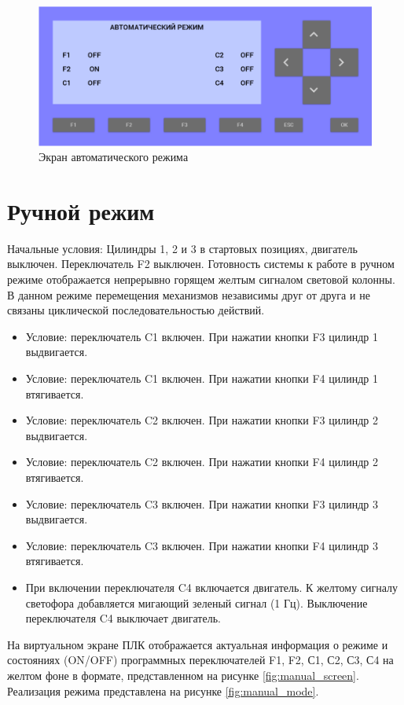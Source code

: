 \begin{figure}[pb]
    \centering
    \includegraphics[scale=0.5]{fig/auto_panel.png}
    \caption{Экран автоматического режима}
    \label{fig:auto_screen}
\end{figure}


\newpage
\section{Ручной режим}
Начальные условия: Цилиндры 1, 2 и 3 в стартовых позициях, двигатель
выключен. Переключатель F2 выключен. Готовность системы к работе в ручном
режиме отображается непрерывно горящем желтым сигналом световой колонны.
В данном режиме перемещения механизмов независимы друг от друга и не
связаны циклической последовательностью действий.

\begin{itemize}
    \item Условие: переключатель C1 включен. При нажатии кнопки F3 цилиндр 1 выдвигается.
    \item Условие: переключатель C1 включен. При нажатии кнопки F4 цилиндр 1 втягивается.
    \item Условие: переключатель C2 включен. При нажатии кнопки F3 цилиндр 2 выдвигается.
    \item Условие: переключатель C2 включен. При нажатии кнопки F4 цилиндр 2 втягивается.
    \item Условие: переключатель C3 включен. При нажатии кнопки F3 цилиндр 3 выдвигается.
    \item Условие: переключатель C3 включен. При нажатии кнопки F4 цилиндр 3 втягивается.
    \item При включении переключателя C4 включается двигатель. К желтому сигналу светофора добавляется мигающий зеленый сигнал (1 Гц). Выключение переключателя C4 выключает двигатель.
\end{itemize}

На виртуальном экране ПЛК отображается актуальная информация о
режиме и состояниях (ON/OFF) программных переключателей F1, F2, С1, С2,
С3, С4 на желтом фоне в формате, представленном на рисунке \ref{fig:manual_screen}.
Реализация режима представлена на рисунке \ref{fig:manual_mode}.

